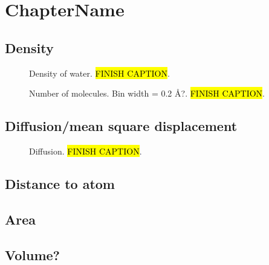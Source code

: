 \chapter{ChapterName}
\section{Density}
\begin{figure}[htpb]%
    \centering%
    \caption{%
        Density of water. \hl{FINISH CAPTION}. %
    }%
\end{figure}%
\begin{figure}[htpb]%
    \centering%
    \caption{%
        Number of molecules. Bin width = 0.2 \AA?. \hl{FINISH CAPTION}. %
    }%
\end{figure}%

\section{Diffusion/mean square displacement}
\begin{figure}[htpb]%
    \centering%
    \caption{%
        Diffusion. \hl{FINISH CAPTION}. %
    }%
\end{figure}%

    \section{Distance to atom}
    \section{Area}
    \section{Volume?}
